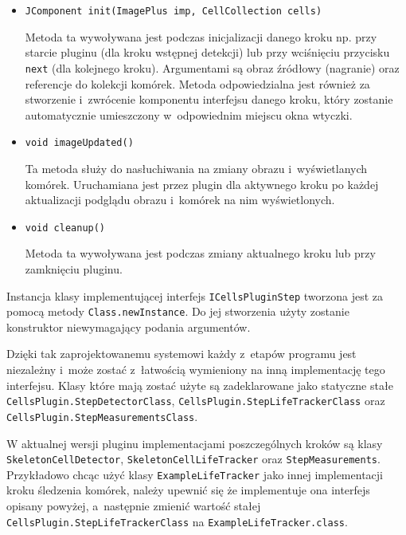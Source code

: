 \documentclass[declaration,shortabstract,mgr]{iithesis}
\begin{document}
\begin{itemize}

\item \texttt{JComponent init(ImagePlus imp, CellCollection cells)}

Metoda ta wywoływana jest podczas inicjalizacji danego kroku np. przy starcie pluginu (dla kroku wstępnej detekcji) lub przy wciśnięciu przycisku \texttt{next} (dla kolejnego kroku).
Argumentami są obraz źródłowy (nagranie) oraz referencje do kolekcji komórek.
Metoda odpowiedzialna jest również za stworzenie i~zwrócenie komponentu interfejsu danego kroku, który zostanie automatycznie umieszczony w~odpowiednim miejscu okna wtyczki.

\item \texttt{void imageUpdated()}

Ta metoda służy do nasłuchiwania na zmiany obrazu i~wyświetlanych komórek.
Uruchamiana jest przez plugin dla aktywnego kroku po każdej aktualizacji podglądu obrazu i~komórek na nim wyświetlonych.

\item \texttt{void cleanup()}

Metoda ta wywoływana jest podczas zmiany aktualnego kroku lub przy zamknięciu pluginu.

\end{itemize}

Instancja klasy implementującej interfejs \texttt{ICellsPluginStep} tworzona jest za pomocą metody \texttt{Class.newInstance}.
Do jej stworzenia użyty zostanie konstruktor niewymagający podania argumentów.

Dzięki tak zaprojektowanemu systemowi każdy z~etapów programu jest niezależny i~może zostać z~łatwością wymieniony na inną implementację tego interfejsu.
Klasy które mają zostać użyte są zadeklarowane jako statyczne stałe \linebreak
\texttt{CellsPlugin.StepDetectorClass}, \texttt{CellsPlugin.StepLifeTrackerClass} oraz \linebreak
\texttt{CellsPlugin.StepMeasurementsClass}.

W aktualnej wersji pluginu implementacjami poszczególnych kroków są klasy \texttt{SkeletonCellDetector}, \texttt{SkeletonCellLifeTracker} oraz \texttt{StepMeasurements}.\linebreak
Przykładowo chcąc użyć klasy \texttt{ExampleLifeTracker} jako innej implementacji kroku śledzenia komórek, należy upewnić się że implementuje ona interfejs opisany powyżej, a~następnie zmienić wartość stałej \texttt{CellsPlugin.StepLifeTrackerClass} na \texttt{ExampleLifeTracker.class}.
\end{document}
